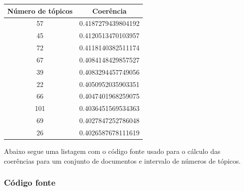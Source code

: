 \begin{center}
\begin{tabular}{ |c|c| }
 \hline
 Número de tópicos & Coerência \\ [0.5ex]
 \hline\hline
 57 & 0.4187279439804192 \\
 45 & 0.4120513470103957 \\
 72 & 0.4118140382511174 \\
 67 & 0.4084148429857527 \\
 39 & 0.4083294457749056 \\
 22 & 0.4050952035903351 \\
 66 & 0.4047401968259075 \\
 101 & 0.4036451569534363 \\
 69 & 0.4027847252786048 \\
 26 & 0.4026587678111619 \\
 \hline
\end{tabular}
\end{center}

Abaixo segue uma listagem com o código fonte usado para o cálculo das coerências para um conjunto de documentos e intervalo de números de tópicos.

\subsubsection{Código fonte}

